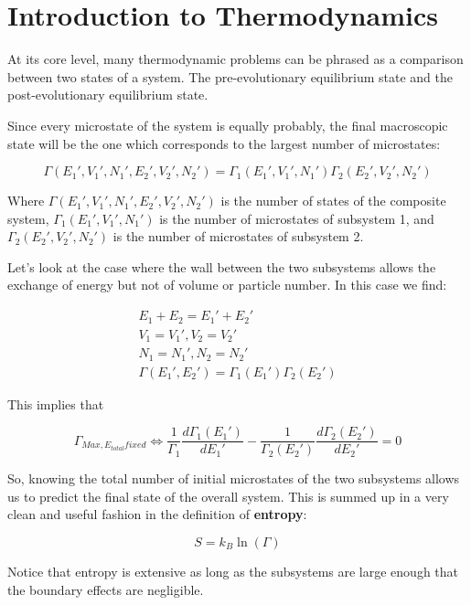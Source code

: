 \documentclass{book}
\newcommand{\dif}[2]{\frac{d#1}{d#2}}
\newcommand{\bltz}{k_{B}}
\begin{document}
\section{Introduction to Thermodynamics}

At its core level, many thermodynamic problems can be phrased as a comparison between two states of a system.  The pre-evolutionary equilibrium state and the post-evolutionary equilibrium state.


Since every microstate of the system is equally probably, the final macroscopic state will be the one which corresponds to the largest number of microstates:

$$\Gamma(E_{1}',V_{1}',N_{1}',E_{2}',V_{2}',N_{2}')=\Gamma_{1}(E_{1}',V_{1}',N_{1}')\Gamma_{2}(E_{2}',V_{2}',N_{2}') $$

Where $\Gamma(E_{1}',V_{1}',N_{1}',E_{2}',V_{2}',N_{2}')$ is the number of states of the composite system, $\Gamma_{1}(E_{1}',V_{1}',N_{1}')$ is the number of microstates of subsystem 1, and $\Gamma_{2}(E_{2}',V_{2}',N_{2}')$ is the number of microstates of subsystem 2.

Let's look at the case where the wall between the two subsystems allows the exchange of energy but not of volume or particle number.  In this case we find:

\begin{multline}
E_{1}+E_{2}=E_{1}'+E_{2}' \\
V_{1}=V_{1}', V_{2}=V_{2}' \\
N_{1}=N_{1}', N_{2}=N_{2}' \\
\Gamma(E_{1}',E_{2}')=\Gamma_{1}(E_{1}')\Gamma_{2}(E_{2}')
\end{multline}

This implies that

$$\Gamma_{Max, E_{total} fixed}\Leftrightarrow\frac{1}{\Gamma_{1}}\dif{\Gamma_{1}(E_{1}')}{E_{1}'}-\frac{1}{\Gamma_{2}(E_{2}')}\dif{\Gamma_{2}(E_{2}')}{E_{2}'}=0$$  

So, knowing the total number of initial microstates of the two subsystems allows us to predict the final state of the overall system.  This is summed up in a very clean and useful fashion in the definition of \textbf{entropy}:

$$S=\bltz\ln(\Gamma)$$
   
Notice that entropy is extensive as long as the subsystems are large enough that the boundary effects are negligible.
\end{document}

